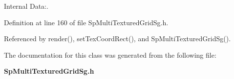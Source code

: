 Internal Data:. 

Definition at line 160 of file Sp\-Multi\-Textured\-Grid\-Sg.h.

Referenced by render(), set\-Tex\-Coord\-Rect(), and Sp\-Multi\-Textured\-Grid\-Sg().

The documentation for this class was generated from the following file:\begin{CompactItemize}
\item 
{\bf Sp\-Multi\-Textured\-Grid\-Sg.h}\end{CompactItemize}

